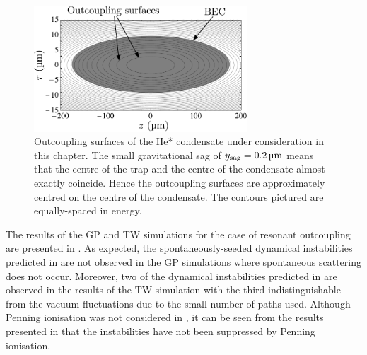 \begin{figure}
    \centering
    \includegraphics[width=8cm]{OutcouplingSurfaces}
    \caption{\label{Peaks:OutcouplingSurfaces} Outcoupling surfaces of the He* condensate under consideration in this chapter. The small gravitational sag of $y_\text{sag} = \unit[0.2]{\micro m}$ means that the centre of the trap and the centre of the condensate almost exactly coincide. Hence the outcoupling surfaces are approximately centred on the centre of the condensate. The contours pictured are equally-spaced in energy.}
\end{figure}

The results of the GP and TW simulations for the case of resonant outcoupling are presented in . As expected, the spontaneously-seeded dynamical instabilities predicted in  are not observed in the GP simulations where spontaneous scattering does not occur. Moreover, two of the dynamical instabilities predicted in  are observed in the results of the TW simulation with the third indistinguishable from the vacuum fluctuations due to the small number of paths used. Although Penning ionisation was not considered in , it can be seen from the results presented in  that the instabilities have not been suppressed by Penning ionisation.

